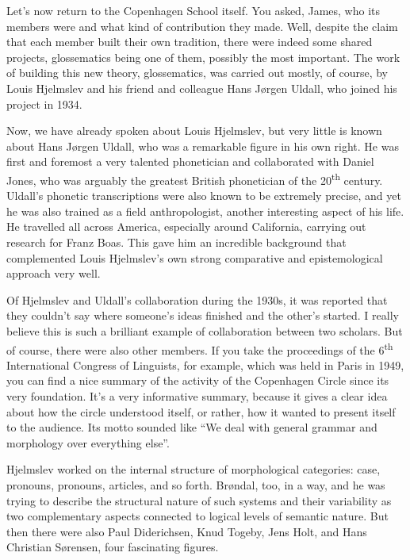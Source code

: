 Let’s now return to the Copenhagen School itself. You asked, James, who its members were and what kind of contribution they made. Well, despite the claim that each member built their own tradition, there were indeed some shared projects, glossematics being one of them, possibly the most important. The work of building this new theory, glossematics, was carried out mostly, of course, by Louis Hjelmslev and his friend and colleague Hans Jørgen Uldall, who joined his project in 1934. 

Now, we have already spoken about Louis Hjelmslev, but very little is known about Hans Jørgen Uldall, who was a remarkable figure in his own right. He was first and foremost a very talented phonetician and collaborated with Daniel Jones, who was arguably the greatest British phonetician of the 20\textsuperscript{th} century. Uldall’s phonetic transcriptions were also known to be extremely precise, and yet he was also trained as a field anthropologist, another interesting aspect of his life. He travelled all across America, especially around California, carrying out research for Franz Boas. This gave him an incredible background that complemented Louis Hjelmslev’s own strong comparative and epistemological approach very well. 

Of Hjelmslev and Uldall’s collaboration during the 1930s, it was reported that they couldn’t say where someone’s ideas finished and the other’s started. I really believe this is such a brilliant example of collaboration between two scholars. But of course, there were also other members. If you take the proceedings of the 6\textsuperscript{th} International Congress of Linguists, for example, which was held in Paris in 1949, you can find a nice summary of the activity of the Copenhagen Circle since its very foundation. It’s a very informative summary, because it gives a clear idea about how the circle understood itself, or rather, how it wanted to present itself to the audience. Its motto sounded like “We deal with general grammar and morphology over everything else”.

Hjelmslev worked on the internal structure of morphological categories: case, pronouns, pronouns, articles, and so forth. Brøndal, too, in a way, and he was trying to describe the structural nature of such systems and their variability as two complementary aspects connected to logical levels of semantic nature. But then there were also Paul Diderichsen, Knud Togeby, Jens Holt, and Hans Christian Sørensen, four fascinating figures.

